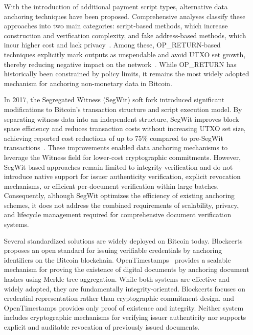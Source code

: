\documentclass{ieeeaccess}
\begin{document}
With the introduction of additional payment script types, alternative data anchoring techniques have been proposed.
Comprehensive analyses classify these approaches into two main categories: script-based methods, which increase construction and verification complexity, and fake address-based methods, which incur higher cost and lack privacy~\cite{Bartoletti2019BitcoinMetadata}.
Among these, OP\_RETURN-based techniques explicitly mark outputs as unspendable and avoid UTXO set growth, thereby reducing negative impact on the network~\cite{Strehle2020DominatingOPReturns}.
While OP\_RETURN has historically been constrained by policy limits, it remains the most widely adopted mechanism for anchoring non-monetary data in Bitcoin.

In 2017, the Segregated Witness (SegWit) soft fork introduced significant modifications to Bitcoin’s transaction structure and script execution model.
By separating witness data into an independent structure, SegWit improves block space efficiency and reduces transaction costs without increasing UTXO set size, achieving reported cost reductions of up to 75\% compared to pre-SegWit transactions~\cite{Kedziora2022AnalysisSegWit}.
These improvements enabled data anchoring mechanisms to leverage the Witness field for lower-cost cryptographic commitments.
However, SegWit-based approaches remain limited to integrity verification and do not introduce native support for issuer authenticity verification, explicit revocation mechanisms, or efficient per-document verification within large batches.
Consequently, although SegWit optimizes the efficiency of existing anchoring schemes, it does not address the combined requirements of scalability, privacy, and lifecycle management required for comprehensive document verification systems.

Several standardized solutions are widely deployed on Bitcoin today.
Blockcerts~\cite{Blockcerts} proposes an open standard for issuing verifiable credentials by anchoring identifiers on the Bitcoin blockchain.
OpenTimestamps~\cite{OpenTimestamps} provides a scalable mechanism for proving the existence of digital documents by anchoring document hashes using Merkle tree aggregation.
While both systems are effective and widely adopted, they are fundamentally integrity-oriented.
Blockcerts focuses on credential representation rather than cryptographic commitment design, and OpenTimestamps provides only proof of existence and integrity.
Neither system includes cryptographic mechanisms for verifying issuer authenticity nor supports explicit and auditable revocation of previously issued documents.
\end{document}
